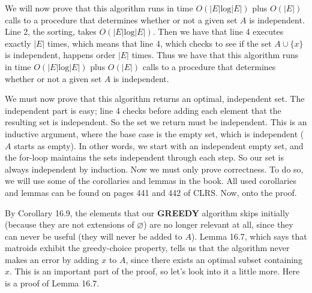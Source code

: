\documentclass{article}
\begin{document}
\begin{description}
        We will now prove that this algorithm runs in time $O(|E|\text{log}|E|)$
        plus $O(|E|)$ calls to a procedure that determines whether or not a
        given set $A$ is independent. Line 2, the sorting, takes
        $O(|E|\text{log}|E|)$. Then we have that line 4 executes exactly $|E|$
        times, which means that line 4, which checks to see if the set
        $A \cup \{x\}$ is independent, happens order $|E|$ times. Thus
        we have that this algorithm runs in time $O(|E|\text{log}|E|)$
        plus $O(|E|)$ calls to a procedure that determines whether or not a
        given set $A$ is independent.

        We must now prove that this algorithm returns an optimal, independent
        set. The independent part is easy; line 4 checks before adding each
        element that the resulting set is independent. So the set we return must
        be independent. This is an inductive argument, where the base case is
        the empty set, which is independent ($A$ starts as empty). In other
        words, we start with an independent empty set, and the for-loop
        maintains the sets independent through each step. So our set is always
        independent by induction. Now we must only prove correctness. To do so,
        we will use some of the corollaries and lemmas in the book. All used
        corollaries and lemmas can be found on pages 441 and 442 of CLRS. Now,
        onto the proof.

        By Corollary 16.9, the elements that our \textbf{GREEDY} algorithm skips initially
        (because they are not extensions of $\varnothing$) are no longer relevant
        at all, since they can never be useful (they will never be added to
        $A$). Lemma 16.7, which says that matroids exhibit the greedy-choice
        property, tells us that the algorithm never makes an error by adding $x$
        to $A$, since there exists an optimal subset containing $x$. This is an
        important part of the proof, so let's look into it a little more. Here
        is a proof of Lemma 16.7.


\end{description}
\end{document}
